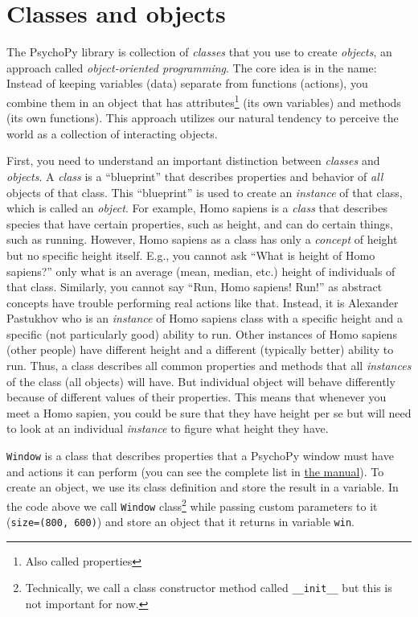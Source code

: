 \documentclass[
]{book}
\begin{document}
\hypertarget{classes-and-objects}{%
\section{Classes and objects}\label{classes-and-objects}}

The PsychoPy library is collection of \emph{classes} that you use to create \emph{objects}, an approach called \emph{object-oriented programming}. The core idea is in the name: Instead of keeping variables (data) separate from functions (actions), you combine them in an object that has attributes\footnote{Also called properties} (its own variables) and methods (its own functions). This approach utilizes our natural tendency to perceive the world as a collection of interacting objects.

First, you need to understand an important distinction between \emph{classes} and \emph{objects}. A \emph{class} is a ``blueprint'' that describes properties and behavior of \emph{all} objects of that class. This ``blueprint'' is used to create an \emph{instance} of that class, which is called an \emph{object}. For example, Homo sapiens is a \emph{class} that describes species that have certain properties, such as height, and can do certain things, such as running. However, Homo sapiens as a class has only a \emph{concept} of height but no specific height itself. E.g., you cannot ask ``What is height of Homo sapiens?'' only what is an average (mean, median, etc.) height of individuals of that class. Similarly, you cannot say ``Run, Homo sapiens! Run!'' as abstract concepts have trouble performing real actions like that. Instead, it is Alexander Pastukhov who is an \emph{instance} of Homo sapiens class with a specific height and a specific (not particularly good) ability to run. Other instances of Homo sapiens (other people) have different height and a different (typically better) ability to run. Thus, a class describes all common properties and methods that all \emph{instances} of the class (all objects) will have. But individual object will behave differently because of different values of their properties. This means that whenever you meet a Homo sapien, you could be sure that they have height per se but will need to look at an individual \emph{instance} to figure what height they have.

\texttt{Window} is a class that describes properties that a PsychoPy window must have and actions it can perform (you can see the complete list in \href{https://psychopy.org/api/visual/window.html\#psychopy.visual.Window}{the manual}). To create an object, we use its class definition and store the result in a variable. In the code above we call \texttt{Window} class\footnote{Technically, we call a class constructor method called \texttt{\_\_init\_\_} but this is not important for now.} while passing custom parameters to it (\texttt{size=(800,\ 600)}) and store an object that it returns in variable \texttt{win}.
\end{document}
